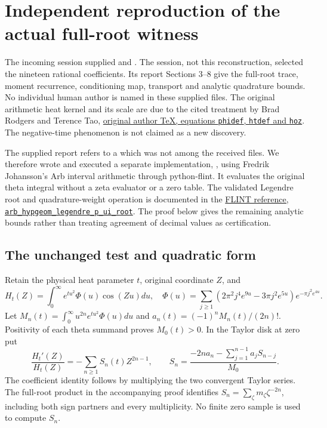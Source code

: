 \section{Independent reproduction of the actual full-root witness}
\label{sec:arb-witness}

The incoming session supplied 
and . The session, not this reconstruction,
selected the nineteen rational coefficients. Its report Sections 3--8
give the full-root trace, moment recurrence, conditioning map, transport
and analytic quadrature bounds. No individual human author is named in
these supplied files. The original arithmetic heat kernel and its scale
are due to the cited treatment by Brad Rodgers and Terence Tao,
\href{https://arxiv.org/abs/1801.05914v5}{original author TeX, equations
\texttt{phidef}, \texttt{htdef} and \texttt{hoz}}. The negative-time
phenomenon is not claimed as a new discovery.

The supplied report refers to a  which was not among
the received files. We therefore wrote and executed a separate
implementation, ,
using Fredrik Johansson's Arb interval arithmetic through python-flint.
It evaluates the original theta integral without a zeta evaluator or a
zero table. The validated Legendre root and quadrature-weight operation
is documented in the
\href{https://flintlib.org/doc/arb_hypgeom.html#c.arb_hypgeom_legendre_p_ui_root}{FLINT
reference, \texttt{arb\_hypgeom\_legendre\_p\_ui\_root}}.
The proof below gives the remaining analytic bounds rather than treating
agreement of decimal values as certification.

\subsection{The unchanged test and quadratic form}
Retain the physical heat parameter $t$, original coordinate $Z$, and
\begin{equation}\tag{RWR1}
 H_t(Z)=\int_0^\infty e^{tu^2}\Phi(u)\cos(Zu)du,
 \quad \Phi(u)=\sum_{j\ge1}(2\pi^2j^4e^{9u}-3\pi j^2e^{5u})
                         e^{-\pi j^2e^{4u}}.
\end{equation}
Let $M_n(t)=\int_0^\infty u^{2n}e^{tu^2}\Phi(u)du$ and
$a_n(t)=(-1)^nM_n(t)/(2n)!$. Positivity of each theta summand proves
$M_0(t)>0$. In the Taylor disk at zero put
\begin{equation}\tag{RWR2}
 \frac{H_t'(Z)}{H_t(Z)}=-\sum_{n\ge1}S_n(t)Z^{2n-1},
 \qquad
 S_n=\frac{-2n a_n-\sum_{j=1}^{n-1}a_jS_{n-j}}{M_0}.
\end{equation}
The coefficient identity follows by multiplying the two convergent
Taylor series. The full-root product in the accompanying proof identifies
$S_n=\sum_\zeta m_\zeta\zeta^{-2n}$, including both sign partners
and every multiplicity. No finite zero sample is used to compute $S_n$.

